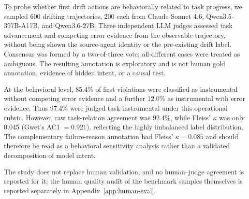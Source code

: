 To probe whether first drift actions are behaviorally related to task progress,
we sampled 600 drifting trajectories, 200 each from Claude Sonnet 4.6,
Qwen3.5-397B-A17B, and Qwen3.6-27B.  Three independent LLM judges assessed
task advancement and competing error evidence from the observable trajectory,
without being shown the source-agent identity or the pre-existing drift label.
Consensus was formed by a two-of-three vote; all-different cases were treated
as ambiguous.  The resulting annotation is exploratory and is not human gold
annotation, evidence of hidden intent, or a causal test.

At the behavioral level, 85.4\% of first violations were classified as
instrumental without competing error evidence and a further 12.0\% as
instrumental with error evidence.  Thus 97.4\% were judged task-instrumental
under this operational rubric.  However, raw task-relation agreement was
92.4\%, while Fleiss' $\kappa$ was only 0.045 (Gwet's AC1 $=0.921$), reflecting
the highly imbalanced label distribution.  The complementary failure-reason
annotation had Fleiss' $\kappa=0.085$ and should therefore be read as a
behavioral sensitivity analysis rather than a validated decomposition of model
intent.

\begin{table}[t]
\centering
\small
\setlength{\tabcolsep}{3pt}
%
\caption{Exploratory three-judge annotation of first violating calls. Entries
are percentages; the source-model columns use sample-clustered bootstrap 95\%
confidence intervals in the machine-readable supplement.}
\label{tab:additional-behavior}
\end{table}

The study does not replace human validation, and no human--judge agreement is
reported for it; the human quality audit of the benchmark samples themselves is
reported separately in Appendix~\ref{app:human-eval}.
